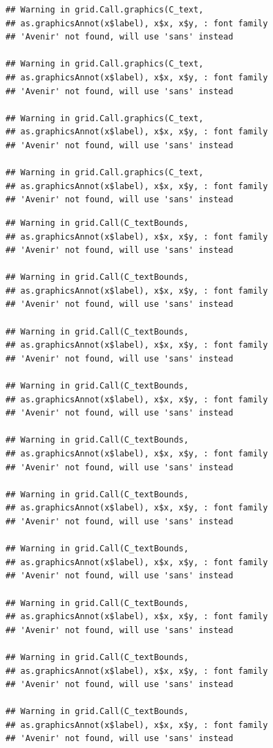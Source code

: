 \documentclass[]{krantz}
\begin{document}
\begin{verbatim}
## Warning in grid.Call.graphics(C_text,
## as.graphicsAnnot(x$label), x$x, x$y, : font family
## 'Avenir' not found, will use 'sans' instead

## Warning in grid.Call.graphics(C_text,
## as.graphicsAnnot(x$label), x$x, x$y, : font family
## 'Avenir' not found, will use 'sans' instead

## Warning in grid.Call.graphics(C_text,
## as.graphicsAnnot(x$label), x$x, x$y, : font family
## 'Avenir' not found, will use 'sans' instead

## Warning in grid.Call.graphics(C_text,
## as.graphicsAnnot(x$label), x$x, x$y, : font family
## 'Avenir' not found, will use 'sans' instead
\end{verbatim}

\begin{verbatim}
## Warning in grid.Call(C_textBounds,
## as.graphicsAnnot(x$label), x$x, x$y, : font family
## 'Avenir' not found, will use 'sans' instead

## Warning in grid.Call(C_textBounds,
## as.graphicsAnnot(x$label), x$x, x$y, : font family
## 'Avenir' not found, will use 'sans' instead

## Warning in grid.Call(C_textBounds,
## as.graphicsAnnot(x$label), x$x, x$y, : font family
## 'Avenir' not found, will use 'sans' instead

## Warning in grid.Call(C_textBounds,
## as.graphicsAnnot(x$label), x$x, x$y, : font family
## 'Avenir' not found, will use 'sans' instead

## Warning in grid.Call(C_textBounds,
## as.graphicsAnnot(x$label), x$x, x$y, : font family
## 'Avenir' not found, will use 'sans' instead

## Warning in grid.Call(C_textBounds,
## as.graphicsAnnot(x$label), x$x, x$y, : font family
## 'Avenir' not found, will use 'sans' instead

## Warning in grid.Call(C_textBounds,
## as.graphicsAnnot(x$label), x$x, x$y, : font family
## 'Avenir' not found, will use 'sans' instead

## Warning in grid.Call(C_textBounds,
## as.graphicsAnnot(x$label), x$x, x$y, : font family
## 'Avenir' not found, will use 'sans' instead

## Warning in grid.Call(C_textBounds,
## as.graphicsAnnot(x$label), x$x, x$y, : font family
## 'Avenir' not found, will use 'sans' instead

## Warning in grid.Call(C_textBounds,
## as.graphicsAnnot(x$label), x$x, x$y, : font family
## 'Avenir' not found, will use 'sans' instead


\end{verbatim}
\end{document}

